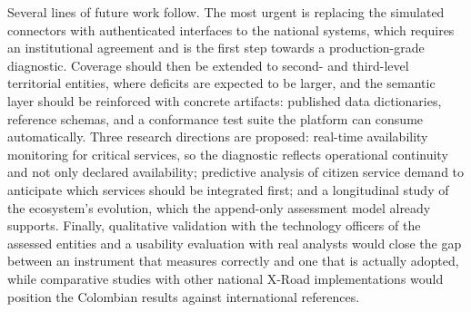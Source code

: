 \documentclass[runningheads]{llncs}
\begin{document}
Several lines of future work follow. The most urgent is replacing the
simulated connectors with authenticated interfaces to the national systems,
which requires an institutional agreement and is the first step towards a
production-grade diagnostic. Coverage should then be extended to second- and
third-level territorial entities, where deficits are expected to be larger, and
the semantic layer should be reinforced with concrete artifacts: published data
dictionaries, reference schemas, and a conformance test suite the platform can
consume automatically. Three research directions are proposed: real-time
availability monitoring for critical services, so the diagnostic reflects
operational continuity and not only declared availability; predictive analysis
of citizen service demand to anticipate which services should be integrated
first; and a longitudinal study of the ecosystem's evolution, which the
append-only assessment model already supports. Finally, qualitative validation
with the technology officers of the assessed entities and a usability
evaluation with real analysts would close the gap between an instrument that
measures correctly and one that is actually adopted, while comparative studies
with other national X-Road implementations would position the Colombian
results against international references.
\end{document}
